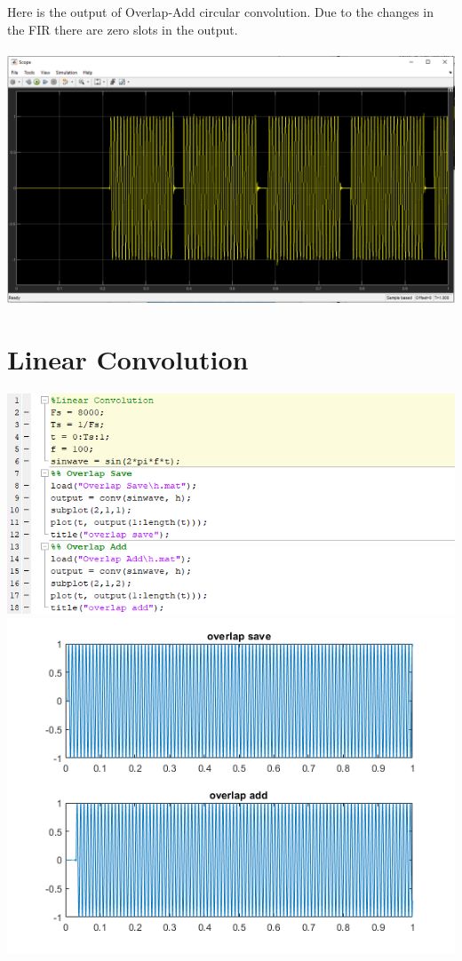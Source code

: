 \documentclass[12pt,a4paper]{article}
\begin{document}
\begin{itemize}
{Here is the output of Overlap-Add circular convolution. Due to the changes in the FIR there are zero slots in the output.\\ \\}
\includegraphics[width=\textwidth]{Photos/overlap add.png}

\end{itemize}
\newpage
\section*{Linear Convolution}


\includegraphics[width=\textwidth]{Photos/linear convolution code.png}
\includegraphics[width=\textwidth]{Photos/linear convolution.png}
\end{document}
